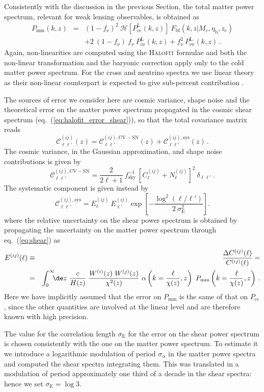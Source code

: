 \documentclass[a4paper,11pt]{article}
\newcommand{\be}{\begin{equation}}
\newcommand{\ee}{\end{equation}}
\newcommand{\bea}{\begin{eqnarray}}
\newcommand{\eea}{\end{eqnarray}}
\newcommand{\nn}{\nonumber}
\newcommand{\eq}[1]{eq.~(\ref{#1})}
\begin{document}
Consistently with the discussion in the previous Section,  the total matter power spectrum, relevant for weak lensing observables, is obtained as
\bea
P_\mathrm{mm}(k,z) & = & (1-f_\nu)^2 \ \mathcal{H}\left[P_\mathrm{cc}^\mathrm{L}(k,z)\right] \ F_\mathrm{bf}(k,z|M_c, \eta_\mathrm b, z_\mathrm c) \nn\\
& & + 2 \ (1-f_\nu) \ f_\nu \ P_\mathrm{c\nu}^\mathrm{L}(k,z) + f_\nu^2 \ P_\mathrm{\nu\nu}^\mathrm{L}(k,z)\,.
\eea
Again, non-linearities are computed using the \textsc{Halofit} formulae and both the non-linear transformation and the baryonic correction apply only to the cold matter power spectrum. For the cross and neutrino spectra we use linear theory as their non-linear counterpart is expected to give sub-percent contribution \cite{DEMNUni+16}.

The sources of error we consider here are cosmic variance, shape noise and the theoretical error on the matter power spectrum propagated in the cosmic shear spectrum (\eq{eq:halofit_error_shear}), so that the total covariance matrix reads
\be
\mathcal{C}^{(ij)}_{\ell\ell'}(z) =
\mathcal{C}^{(ij), \mathrm{CV-SN}}_{\ell\ell'}(z) + \mathcal{C}^{(ij), \mathrm{sys}}_{\ell\ell'}(z)\, .
\label{eq:covmat_Cl}
\ee
The cosmic variance, in the Gaussian approximation, and shape noise contributions is given by
\be
\mathcal{C}^{(ij), \mathrm{CV-SN}}_{\ell\ell'}=
\frac{2}{2\ell+1} \ f_{\mathrm{sky}}^{-1} \ \left. \left[C_\ell^{(ij)} + N_\ell^{(ij)} \right]\right.^2 \ \delta_{\ell\ell'} \,.
\ee
The systematic component is given instead by
\be
 \mathcal{C}^{(ij), \mathrm{sys}}_{\ell\ell'} =
E_{\ell}^{(ij)} \ E_{\ell'}^{(ij)} \exp{\left[-\frac{\log^2(\ell/\ell')}{2 \ \sigma_\mathrm E^2}\right]}.
\ee
where the relative uncertainty on the shear power spectrum is obtained by propagating the uncertainty on the matter power spectrum through \eq{eq:shear} as
\bea
E^{(ij)}(\ell) & \equiv & \frac{\Delta C^{(ij)}(\ell)}{C^{(ij)}(\ell)} = \nn\\
& = &  \int_0^\infty \!\!\!\de z \ \frac{c}{H(z)} \ \frac{W^{(i)}(z) \ W^{(j)}(z)}{\chi^2(z)} \ \alpha\left(k=\frac{\ell}{\chi(z)},z\right) \ P_\mathrm{mm}\left(k=\frac{\ell}{\chi(z)}, z \right)\,.
\label{eq:halofit_error_shear}
\eea
Here we have implicitly assumed that the error on $P_\mathrm{mm}$ is the same of that on $P_\mathrm{cc}$, since the other quantities are involved at the linear level and are therefore known with high precision. 

The value for the correlation length $\sigma_\mathrm E$ for the error on the shear power spectrum is chosen consistently with the one on the matter power spectrum. To estimate it we introduce a logarithmic modulation of period $\sigma_\alpha$ in the matter power spectra and computed the shear spectra integrating them.
This was translated in a modulation of period approximately one third of a decade in the shear spectra: hence we set $\sigma_\mathrm E = \log 3$.
\end{document}
